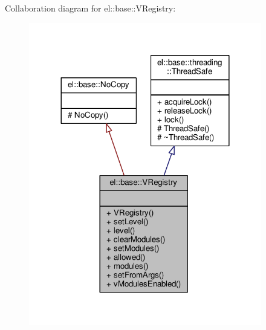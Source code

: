 Collaboration diagram for el\+:\+:base\+:\+:V\+Registry\+:
\nopagebreak
\begin{figure}[H]
\begin{center}
\leavevmode
\includegraphics[width=288pt]{d6/d54/classel_1_1base_1_1VRegistry__coll__graph}
\end{center}
\end{figure}
